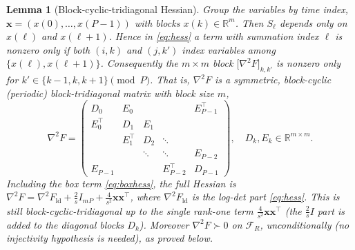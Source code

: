 \documentclass{amsart}
\newtheorem{lemma}{Lemma}
\newcommand{\R}{\mathbb{R}}
\begin{document}
\begin{lemma}[Block-cyclic-tridiagonal Hessian]\label{lem:struct}
Group the variables by time index, $\bm x=(x(0),\dots,x(P-1))$ with blocks
$x(k)\in\R^{m}$. Then $S_\ell$ depends only on $x(\ell)$ and $x(\ell+1)$. Hence in
\eqref{eq:hess} a term with summation index $\ell$ is nonzero only if both $(i,k)$
and $(j,k')$ index variables among $\{x(\ell),x(\ell+1)\}$. Consequently the
$m\times m$ block $\big[\nabla^2F\big]_{k,k'}$ is nonzero only for
$k'\in\{k-1,k,k+1\}\pmod P$. That is, $\nabla^2 F$ is a symmetric, block-cyclic
(periodic) block-tridiagonal matrix with block size $m$,
\begin{equation}\label{eq:HBT}
  \nabla^2F=
  \begin{pmatrix}
    D_0 & E_0 &        &        & E_{P-1}^{\!\top}\\
    E_0^{\!\top} & D_1 & E_1 &        & \\
        & E_1^{\!\top} & D_2 & \ddots & \\
        &        & \ddots & \ddots & E_{P-2}\\
    E_{P-1} &     &        & E_{P-2}^{\!\top} & D_{P-1}
  \end{pmatrix},
  \quad D_k,E_k\in\R^{m\times m}.
\end{equation}
Including the box term \eqref{eq:boxhess}, the full Hessian is
$\nabla^2F=\nabla^2F_{\mathrm{ld}}+\tfrac2sI_{mP}+\tfrac4{s^2}\bm x\bm x^{\!\top}$,
where $\nabla^2F_{\mathrm{ld}}$ is the log-det part \eqref{eq:hess}. This is still
block-cyclic-tridiagonal up to the single rank-one term $\tfrac4{s^2}\bm x\bm
x^{\!\top}$ (the $\tfrac2sI$ part is added to the diagonal blocks $D_k$).
Moreover $\nabla^2 F\succ0$ on $\mathcal F_R$, \emph{unconditionally} (no injectivity
hypothesis is needed), as proved below.
\end{lemma}
\end{document}
